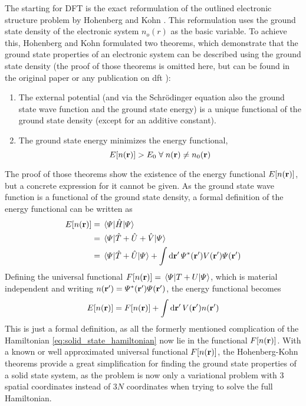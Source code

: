 \documentclass[main.tex]{subfiles}
\begin{document}
The starting for DFT is the exact reformulation of the outlined electronic structure problem by Hohenberg and Kohn \cite{hohenberg_inhomogeneous_1964}.
This reformulation uses the ground state density of the electronic system \(n_o (r)\) as the basic variable.
To achieve this, Hohenberg and Kohn \cite{hohenberg_inhomogeneous_1964} formulated two theorems, which demonstrate that the ground state properties of an electronic system can be described using the ground state density (the proof of those theorems is omitted here, but can be found in the original paper \cite{hohenberg_inhomogeneous_1964} or any publication on \acrshort{dft} \cite{marzari_ab-initio_1996}):
\begin{enumerate}[I]
    \item The external potential (and via the Schrödinger equation also the ground state wave function and the ground state energy) is a unique functional of the ground state density (except for an additive constant).
    \item The ground state energy minimizes the energy functional,
    \[E[n(\vb{r})] > E_0 \;\forall\; n(\vb{r}) \neq n_0 (\vb{r})\]
\end{enumerate}
The proof of those theorems show the existence of the energy functional \(E[n(\vb{r})]\), but a concrete expression for it cannot be given.
As the ground state wave function is a functional of the ground state density, a formal definition of the energy functional can be written as
\begin{align*}
    E[n(\vb{r})] &= \expval{\hat{H}}{\Psi} \\
    &= \expval{\hat{T} + \hat{U} + \hat{V}}{\Psi} \\
    &= \expval{\hat{T} + \hat{U}}{\Psi} + \int \dd{\vb{r}^{\prime}} \Psi^* (\vb{r}^{\prime}) V(\vb{r}^{\prime}) \Psi (\vb{r}^{\prime})
\end{align*}
Defining the universal functional \(F[n(\vb{r})] = \expval{T + U}{\Psi}\), which is material independent and writing \(n (\vb{r}^{\prime}) = \Psi^* (\vb{r}^{\prime}) \Psi (\vb{r}^{\prime})\), the energy functional becomes
\begin{equation}\label{eq:hohenberg_kohn_energy_functional}
    E[n(\vb{r})] = F[n(\vb{r})] + \int \dd{\vb{r}^{\prime}} V(\vb{r}^{\prime}) n (\vb{r}^{\prime})
\end{equation}
This is just a formal definition, as all the formerly mentioned complication of the Hamiltonian \ref{eq:solid_state_hamiltonian} now lie in the functional \(F[n(\vb{r})]\).
With a known or well approximated universal functional \(F[n(\vb{r})]\), the Hohenberg-Kohn theorems provide a great simplification for finding the ground state properties of a solid state system, as the problem is now only a variational problem with 3 spatial coordinates instead of \(3N\) coordinates when trying to solve the full Hamiltonian.
\end{document}
